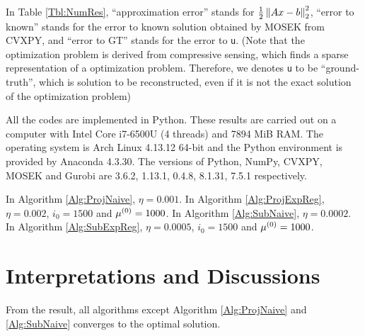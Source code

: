 \documentclass[english]{pkupaper}
\begin{document}
In Table \ref{Tbl:NumRes}, ``approximation error'' stands for $ \frac{1}{2} \left\|  A x - b  \right\|_2^2 $, ``error to known'' stands for the error to known solution obtained by MOSEK from CVXPY, and ``error to GT'' stands for the error to \verb"u". (Note that the optimization problem is derived from compressive sensing, which finds a sparse representation of a optimization problem. Therefore, we denotes \verb"u" to be ``ground-truth'', which is solution to be reconstructed, even if it is not the exact solution of the optimization problem)

All the codes are implemented in Python. These results are carried out on a computer with Intel Core i7-6500U (4 threads) and 7894 MiB RAM. The operating system is Arch Linux 4.13.12 64-bit and the Python environment is provided by Anaconda 4.3.30. The versions of Python, NumPy, CVXPY, MOSEK and Gurobi are 3.6.2, 1.13.1, 0.4.8, 8.1.31, 7.5.1 respectively.

In Algorithm \ref{Alg:ProjNaive}, $ \eta = 0.001 $. In Algorithm \ref{Alg:ProjExpReg}, $ \eta = 0.002 $, $ i_0 = 1500 $ and $ \mu^{\left( 0 \right)} = 1000 $. In Algorithm \ref{Alg:SubNaive}, $ \eta = 0.0002 $. In Algorithm \ref{Alg:SubExpReg}, $ \eta = 0.0005 $, $ i_0 = 1500 $ and $ \mu^{\left( 0 \right)} = 1000 $.

\section{Interpretations and Discussions}

From the result, all algorithms except Algorithm \ref{Alg:ProjNaive} and \ref{Alg:SubNaive} converges to the optimal solution.
\end{document}
